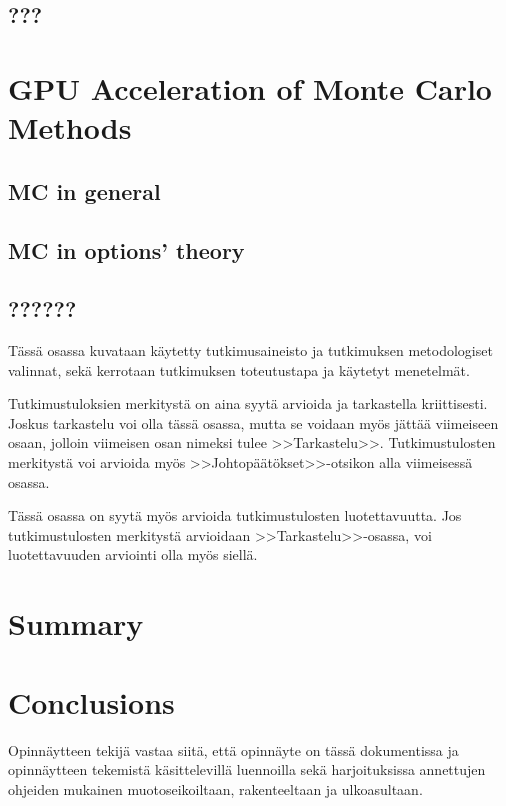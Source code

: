 \documentclass[english,12pt,a4paper,pdftex,sci,utf8]{aaltothesis}
\begin{document}
\subsection{???}

\section{GPU Acceleration of Monte Carlo Methods} \label{sec:gpu-mc}
\subsection{MC in general}
\subsection{MC in options' theory}
\subsection{??????}

T\"ass\"a osassa kuvataan k\"aytetty tutkimusaineisto ja
tutkimuksen metodologiset valinnat, sek\"a
kerrotaan tutkimuksen toteutustapa ja k\"aytetyt menetelm\"at. 

\clearpage


Tutkimustuloksien merkityst\"a on aina syyt\"a arvioida ja tarkastella
kriittisesti.  Joskus tarkastelu voi olla t\"ass\"a osassa, mutta se
voidaan my\"os j\"att\"a\"a viimeiseen osaan, jolloin viimeisen osan nimeksi
tulee >>Tarkastelu>>. Tutkimustulosten merkityst\"a voi arvioida my\"os
>>Johtop\"a\"at\"okset>>-otsikon alla viimeisess\"a osassa. 

T\"ass\"a osassa on syyt\"a my\"os arvioida tutkimustulosten luotettavuutta.
Jos tutkimustulosten merkityst\"a arvioidaan >>Tarkastelu>>-osassa,
voi luotettavuuden arviointi olla my\"os siell\"a. 

\clearpage

\section{Summary}  \label{sec:summary}

\section{Conclusions}  \label{sec:conclusions}


Opinn\"aytteen tekij\"a vastaa siit\"a, ett\"a opinn\"ayte on t\"ass\"a dokumentissa
ja opinn\"aytteen tekemist\"a k\"asittelevill\"a luennoilla sek\"a
harjoituksissa annettujen ohjeiden mukainen muotoseikoiltaan,
rakenteeltaan ja ulkoasultaan.\cite{grochowski2004best}


\cleardoublepage
{}



\end{document}
